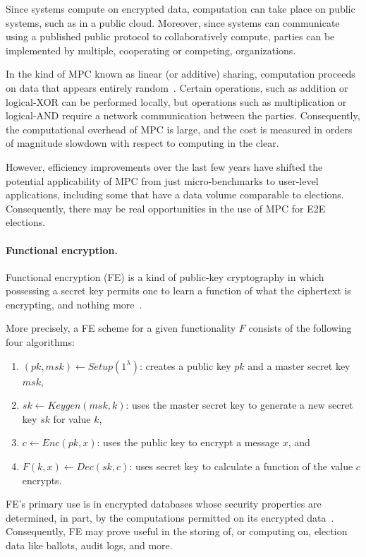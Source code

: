 Since systems compute on encrypted data, computation can take place on
public systems, such as in a public cloud. Moreover, since systems can
communicate using a published public protocol to collaboratively
compute, parties can be implemented by multiple, cooperating or
competing, organizations.

In the kind of MPC known as linear (or additive) sharing, computation
proceeds on data that appears entirely random~\cite{LSS}. Certain
operations, such as addition or logical-XOR can be performed locally,
but operations such as multiplication or logical-AND require a network
communication between the parties. Consequently, the computational
overhead of MPC is large, and the cost is measured in orders of
magnitude slowdown with respect to computing in the clear.

However, efficiency improvements over the last few years have shifted
the potential applicability of MPC from just micro-benchmarks to
user-level applications, including some that have a data volume
comparable to elections. Consequently, there may be real opportunities
in the use of MPC for E2E elections.

\paragraph{Functional encryption.} Functional encryption (FE) is a
kind of public-key cryptography in which possessing a secret key
permits one to learn a function of what the ciphertext is encrypting,
and nothing more~\cite{FE}.

More precisely, a FE scheme for a given functionality $F$ consists of
the following four algorithms:
\begin{enumerate}
\item $(pk, msk) \leftarrow Setup(1^\lambda)$: creates a public key
  $pk$ and a master secret key $msk$,
\item $sk \leftarrow Keygen(msk, k)$: uses the master secret key to
  generate a new secret key $sk$ for value $k$,
\item $c \leftarrow Enc(pk, x)$: uses the public key to encrypt a
  message $x$, and
\item $F(k, x) \leftarrow Dec(sk, c)$: uses secret key to calculate a
  function of the value $c$ encrypts.
\end{enumerate}

FE's primary use is in encrypted databases whose security properties
are determined, in part, by the computations permitted on its
encrypted data~\cite{CryptDB}. Consequently, FE may prove useful in
the storing of, or computing on, election data like ballots, audit
logs, and more.

